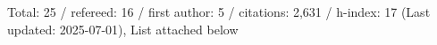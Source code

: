 Total: 25 / refereed: 16 / first author: 5 / citations: 2,631 / h-index: 17 (Last updated: 2025-07-01), List attached below